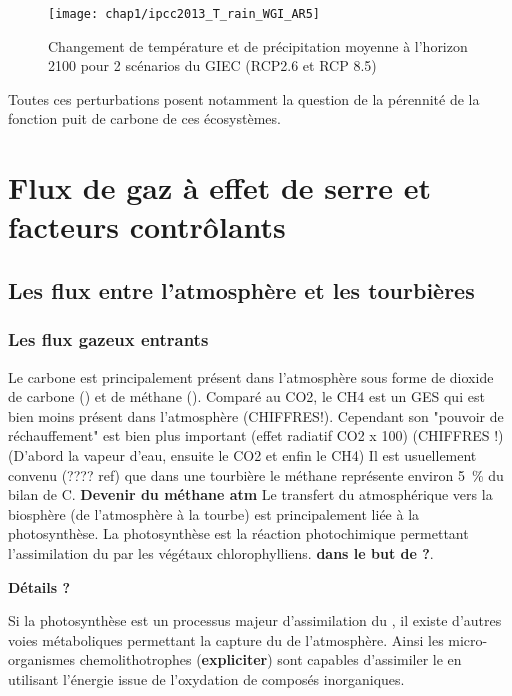 \begin{figure}
\centering
\texttt{[image: chap1/ipcc2013\_T\_rain\_WGI\_AR5]}
\caption{Changement de température et de précipitation moyenne à l'horizon 2100 pour 2 scénarios du GIEC (RCP2.6 et RCP 8.5)}
\label{fig:ipcc2013_T_rain}
\end{figure}

Toutes ces perturbations posent notamment la question de la pérennité de la fonction puit de carbone de ces écosystèmes.


\section{Flux de gaz à effet de serre et facteurs contrôlants}

\subsection{Les flux entre l'atmosphère et les tourbières}

\subsubsection{Les flux gazeux entrants}

Le carbone est principalement présent dans l'atmosphère sous forme de dioxide de carbone (\coo) et de méthane (\chh).
Comparé au CO2, le CH4 est un GES qui est bien moins présent dans l'atmosphère (CHIFFRES!).
Cependant son "pouvoir de réchauffement" est bien plus important (effet radiatif CO2 x 100) (CHIFFRES !) (D'abord la vapeur d'eau, ensuite le CO2 et enfin le CH4)
Il est usuellement convenu (???? ref) que dans une tourbière le méthane représente environ \SI{5}{\percent} du bilan de C.
\textbf{Devenir du méthane atm}
Le transfert du \coo atmosphérique vers la biosphère (de l'atmosphère à la tourbe) est principalement \plop liée à la photosynthèse.
La photosynthèse est la réaction photochimique permettant l'assimilation du \coo par les végétaux chlorophylliens.
\textbf{dans le but de ?}.

\textbf{Détails ?}

Si la photosynthèse est un processus majeur d'assimilation du \coo, il existe d'autres voies métaboliques permettant la capture du \coo de l'atmosphère.
Ainsi les micro-organismes chemolithotrophes (\textbf{expliciter}) sont capables d'assimiler le \coo en utilisant l'énergie issue de l'oxydation de composés inorganiques.

